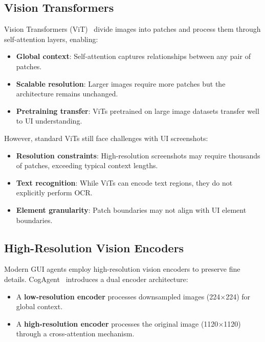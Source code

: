 \documentclass[11pt]{article}
\begin{document}
\subsection{Vision Transformers}

Vision Transformers (ViT)~\cite{dosovitskiy2020} divide images into patches and process them through self-attention layers, enabling:

\begin{itemize}
    \item \textbf{Global context}: Self-attention captures relationships between any pair of patches.
    \item \textbf{Scalable resolution}: Larger images require more patches but the architecture remains unchanged.
    \item \textbf{Pretraining transfer}: ViTs pretrained on large image datasets transfer well to UI understanding.
\end{itemize}

However, standard ViTs still face challenges with UI screenshots:

\begin{itemize}
    \item \textbf{Resolution constraints}: High-resolution screenshots may require thousands of patches, exceeding typical context lengths.
    \item \textbf{Text recognition}: While ViTs can encode text regions, they do not explicitly perform OCR.
    \item \textbf{Element granularity}: Patch boundaries may not align with UI element boundaries.
\end{itemize}

\subsection{High-Resolution Vision Encoders}

Modern GUI agents employ high-resolution vision encoders to preserve fine details. CogAgent~\cite{cogagent2023} introduces a dual encoder architecture:

\begin{itemize}
    \item A \textbf{low-resolution encoder} processes downsampled images (224$\times$224) for global context.
    \item A \textbf{high-resolution encoder} processes the original image (1120$\times$1120) through a cross-attention mechanism.
\end{itemize}
\end{document}
